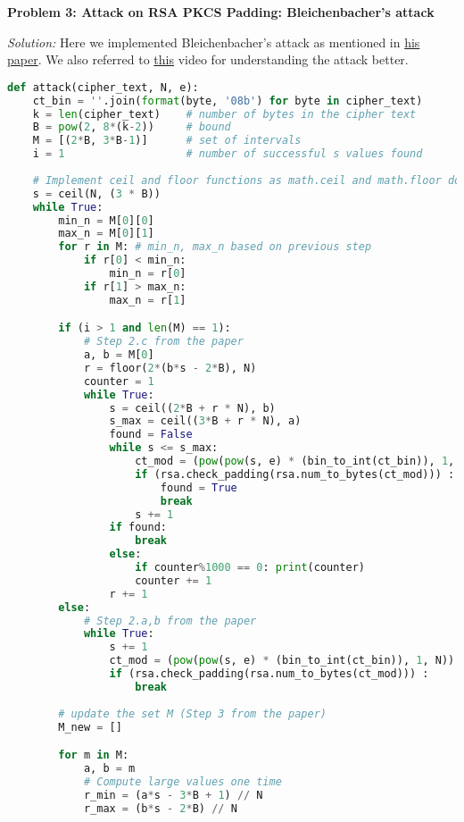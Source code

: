 \documentclass[a4paper, 11pt]{article}
\newenvironment{solution}
    {\textit{Solution:}}
    {}
\newcommand{\prob}[1]{\begin{mdframed}[backgroundcolor=gray!20] \textbf{Problem #1}\end{mdframed}}
\begin{document}
\prob{3: Attack on RSA PKCS Padding: Bleichenbacher's attack}
\begin{solution}
    Here we implemented Bleichenbacher's attack as mentioned in \href{https://archiv.infsec.ethz.ch/education/fs08/secsem/bleichenbacher98.pdf}{his paper}. We also referred to \href{https://youtu.be/iA6OevUmeHk?si=m38o_MBNJr53BtM8}{this} video for understanding the attack better.
    
    \begin{lstlisting}[language=Python, caption=Bleichenbacher's attack]
def attack(cipher_text, N, e):
    ct_bin = ''.join(format(byte, '08b') for byte in cipher_text)
    k = len(cipher_text)    # number of bytes in the cipher text
    B = pow(2, 8*(k-2))     # bound
    M = [(2*B, 3*B-1)]      # set of intervals
    i = 1                   # number of successful s values found
    
    # Implement ceil and floor functions as math.ceil and math.floor don't work for large numbers
    s = ceil(N, (3 * B))
    while True:
        min_n = M[0][0]
        max_n = M[0][1]
        for r in M: # min_n, max_n based on previous step
            if r[0] < min_n:
                min_n = r[0]
            if r[1] > max_n:
                max_n = r[1]

        if (i > 1 and len(M) == 1):
            # Step 2.c from the paper 
            a, b = M[0]
            r = floor(2*(b*s - 2*B), N)
            counter = 1
            while True:
                s = ceil((2*B + r * N), b)
                s_max = ceil((3*B + r * N), a)
                found = False
                while s <= s_max:
                    ct_mod = (pow(pow(s, e) * (bin_to_int(ct_bin)), 1, N))
                    if (rsa.check_padding(rsa.num_to_bytes(ct_mod))) : 
                        found = True
                        break
                    s += 1
                if found:
                    break
                else:
                    if counter%1000 == 0: print(counter)
                    counter += 1
                r += 1
        else:
            # Step 2.a,b from the paper
            while True:
                s += 1
                ct_mod = (pow(pow(s, e) * (bin_to_int(ct_bin)), 1, N))
                if (rsa.check_padding(rsa.num_to_bytes(ct_mod))) :
                    break
        
        # update the set M (Step 3 from the paper)
        M_new = []

        for m in M:
            a, b = m
            # Compute large values one time
            r_min = (a*s - 3*B + 1) // N
            r_max = (b*s - 2*B) // N


\end{lstlisting}
\end{solution}
\end{document}
